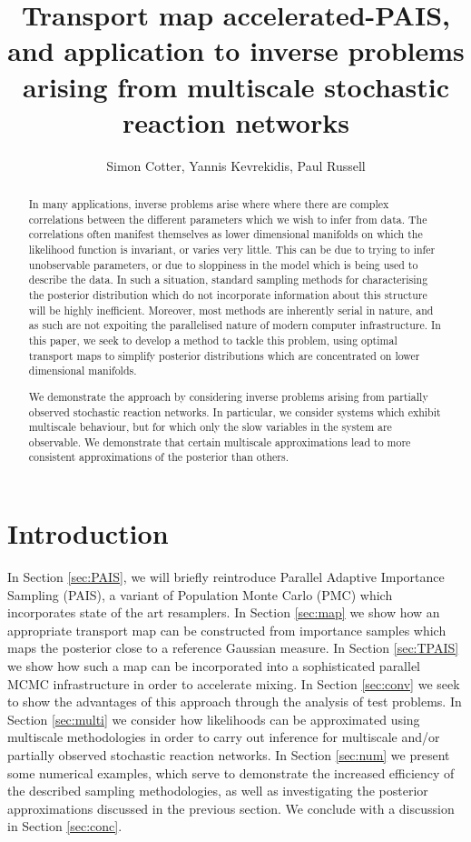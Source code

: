 \documentclass[final]{siamltex}
\title{Transport map accelerated-PAIS, and application to inverse problems arising from
  multiscale stochastic reaction networks}
\author{Simon Cotter, Yannis Kevrekidis, Paul Russell}
\begin{document}
\maketitle
\begin{abstract}
In many applications, inverse problems arise where where there are
complex correlations between the different parameters which we wish to
infer from data. The correlations often manifest themselves as lower
dimensional manifolds on which the likelihood function is
invariant, or varies very little. This can be due to trying to infer
unobservable parameters, or due to sloppiness in the model which is
being used to describe the data. In such a situation, standard
sampling methods for characterising the posterior distribution which
do not incorporate information about this structure will be highly
inefficient. Moreover, most methods are inherently serial in nature,
and as such are not expoiting the parallelised  nature of modern
computer infrastructure. In this paper, we seek to develop a method to
tackle this problem, using optimal transport maps to simplify
posterior distributions which are concentrated on lower dimensional
manifolds.

We demonstrate the approach by considering inverse problems arising
from partially observed stochastic reaction networks. In particular,
we consider systems which exhibit multiscale behaviour, but for which
only the slow variables in the system are observable. We demonstrate
that certain multiscale approximations lead to more consistent
approximations of the posterior than others.
\end{abstract}


\section{Introduction}

In Section \ref{sec:PAIS}, we will briefly reintroduce Parallel
Adaptive Importance Sampling (PAIS), a variant of Population Monte
Carlo (PMC) which incorporates state of the art resamplers. In Section \ref{sec:map} we show how an appropriate transport map can
be constructed from importance samples which maps the posterior close
to a reference Gaussian measure. In Section \ref{sec:TPAIS} we show
how such a map can be incorporated into a sophisticated parallel MCMC
infrastructure in order to accelerate mixing. In Section
\ref{sec:conv} we seek to show the advantages of this approach through
the analysis of test problems. In Section
\ref{sec:multi} we consider how likelihoods can be approximated using
 multiscale methodologies in order to carry out inference for
multiscale and/or partially observed stochastic reaction networks. In
Section \ref{sec:num} we present some numerical examples, which serve
to demonstrate the increased efficiency of the described sampling
methodologies, as well as investigating the posterior approximations
discussed in the previous section. We conclude with a discussion in
Section \ref{sec:conc}.
\end{document}
